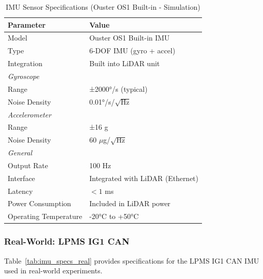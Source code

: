 \begin{table}[htbp]
\centering
\caption{IMU Sensor Specifications (Ouster OS1 Built-in - Simulation)}
\label{tab:imu_specs_sim}
\begin{tabular}{@{}ll@{}}
\toprule
\textbf{Parameter} & \textbf{Value} \\
\midrule
Model & Ouster OS1 Built-in IMU \\
Type & 6-DOF IMU (gyro + accel) \\
Integration & Built into LiDAR unit \\
\midrule
\multicolumn{2}{l}{\textit{Gyroscope}} \\
Range & ±2000°/s (typical) \\
Noise Density & 0.01°/s/$\sqrt{\text{Hz}}$ \\
\midrule
\multicolumn{2}{l}{\textit{Accelerometer}} \\
Range & ±16 g \\
Noise Density & 60 $\mu$g/$\sqrt{\text{Hz}}$ \\
\midrule
\multicolumn{2}{l}{\textit{General}} \\
Output Rate & 100 Hz \\
Interface & Integrated with LiDAR (Ethernet) \\
Latency & $< 1$ ms \\
Power Consumption & Included in LiDAR power \\
Operating Temperature & -20°C to +50°C \\
\bottomrule
\end{tabular}
\end{table}

\subsubsection{Real-World: LPMS IG1 CAN}

Table~\ref{tab:imu_specs_real} provides specifications for the LPMS IG1 CAN IMU used in real-world experiments.

